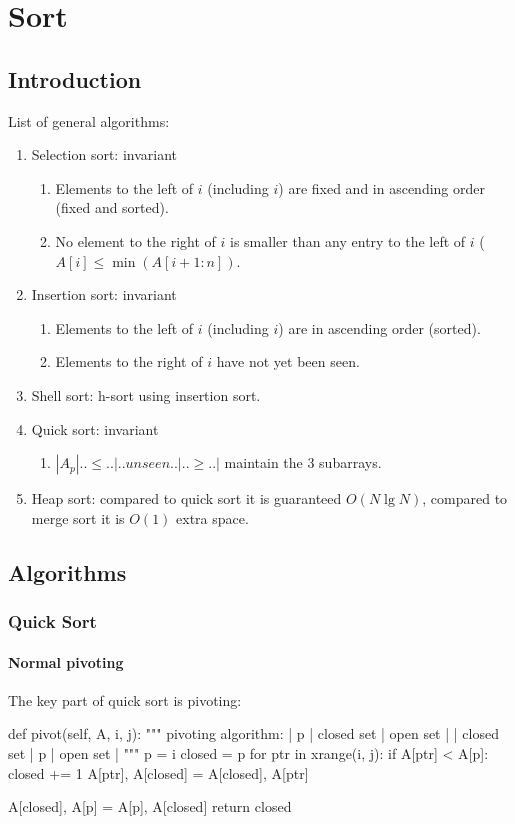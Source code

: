 \chapter{Sort}


\section{Introduction}
List of general algorithms:
\begin{enumerate}
\item Selection sort: invariant
\begin{enumerate}
\item Elements to the left of $i$ (including $i$) are fixed and in ascending order (fixed and sorted).
\item No element to the right of $i$ is smaller than any entry to the left of $i$ ($A[i]  \leq\min(A[i+1:n])$.
\end{enumerate}
\item Insertion sort: invariant
\begin{enumerate}
\item Elements to the left of $i$ (including $i$) are in ascending order (sorted).
\item Elements to the right of $i$ have not yet been seen.
\end{enumerate}
\item Shell sort: h-sort using insertion sort.
\item Quick sort: invariant
\begin{enumerate}
\item $|A_p|..\leq..|..unseen..|..\geq..|$ maintain the 3 subarrays.
\end{enumerate}
\item Heap sort: compared to quick sort it is guaranteed $O(N \lg N)$, compared to merge sort it is $O(1)$ extra space. 
\end{enumerate}

\section{Algorithms}
\subsection{Quick Sort}
\subsubsection{Normal pivoting}\label{section:pivot}
The key part of quick sort is pivoting:
\newpage
\begin{python}
def pivot(self, A, i, j):
    """
    pivoting algorithm:
    | p | closed set | open set |
    | closed set | p | open set |
    """
    p = i
    closed = p
    for ptr in xrange(i, j):
        if A[ptr] < A[p]:
            closed += 1
            A[ptr], A[closed] = A[closed], A[ptr]

    A[closed], A[p] = A[p], A[closed]
    return closed
\end{python}

